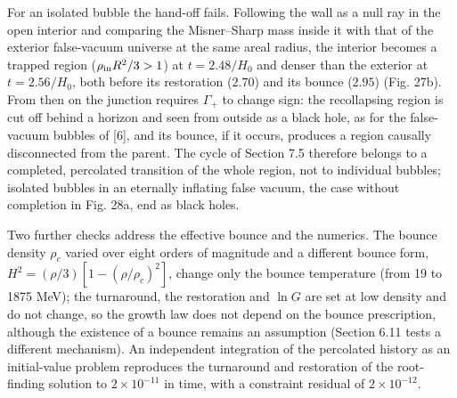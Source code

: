 \documentclass[11pt,a4paper]{article}
\begin{document}
For an isolated bubble the hand-off fails. Following the wall as a null ray in the open interior and comparing the Misner--Sharp mass inside it with that of the exterior false-vacuum universe at the same areal radius, the interior becomes a trapped region ($\rho_{\rm in}R^2/3>1$) at $t=2.48/H_0$ and denser than the exterior at $t=2.56/H_0$, both before its restoration ($2.70$) and its bounce ($2.95$) (Fig. 27b). From then on the junction requires $\Gamma_+$ to change sign: the recollapsing region is cut off behind a horizon and seen from outside as a black hole, as for the false-vacuum bubbles of [6], and its bounce, if it occurs, produces a region causally disconnected from the parent. The cycle of Section 7.5 therefore belongs to a completed, percolated transition of the whole region, not to individual bubbles; isolated bubbles in an eternally inflating false vacuum, the case without completion in Fig. 28a, end as black holes.

Two further checks address the effective bounce and the numerics. The bounce density $\rho_c$ varied over eight orders of magnitude and a different bounce form, $H^2=(\rho/3)[1-(\rho/\rho_c)^2]$, change only the bounce temperature (from 19 to 1875 MeV); the turnaround, the restoration and $\ln G$ are set at low density and do not change, so the growth law does not depend on the bounce prescription, although the existence of a bounce remains an assumption (Section 6.11 tests a different mechanism). An independent integration of the percolated history as an initial-value problem reproduces the turnaround and restoration of the root-finding solution to $2\times10^{-11}$ in time, with a constraint residual of $2\times10^{-12}$.
\end{document}

